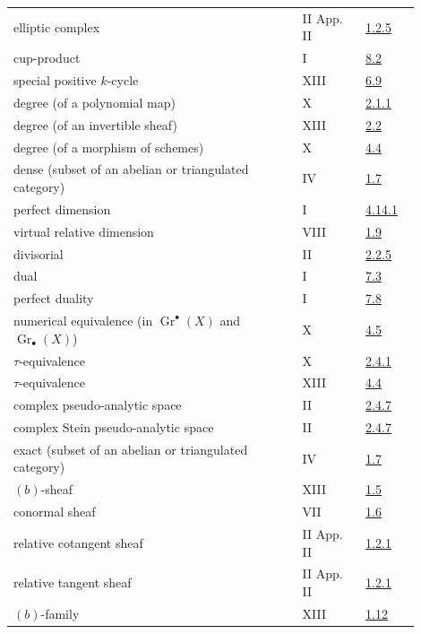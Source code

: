 \begin{longtable}{@{}>{\raggedright\arraybackslash}p{0.64\linewidth}>{\raggedright\arraybackslash}p{0.14\linewidth}>{\raggedright\arraybackslash}p{0.12\linewidth}@{}}
elliptic complex & II App. II & \hyperlink{sga6.e02.para.1-2-5}{1.2.5}\\
cup-product & I & \hyperlink{sga6.e01.para.8-2}{8.2}\\
special positive \(k\)-cycle & XIII & \hyperlink{sga6.e13.def.6-9}{6.9}\\
degree (of a polynomial map) & X & \hyperlink{sga6.e10.def.2-1-1}{2.1.1}\\
degree (of an invertible sheaf) & XIII & \hyperlink{sga6.e13.para.2-2}{2.2}\\
degree (of a morphism of schemes) & X & \hyperlink{sga6.e10.sec.4.4}{4.4}\\
dense (subset of an abelian or triangulated category) & IV & \hyperlink{sga6.e04.def.1-7}{1.7}\\
perfect dimension & I & \hyperlink{sga6.e01.def.4-14-1}{4.14.1}\\
virtual relative dimension & VIII & \hyperlink{sga6.e08.def.1-9}{1.9}\\
divisorial & II & \hyperlink{sga6.e02.def.2-2-5}{2.2.5}\\
dual & I & \hyperlink{sga6.e01.def.7-3}{7.3}\\
perfect duality & I & \hyperlink{sga6.e01.cor.7-8}{7.8}\\
numerical equivalence (in \(\operatorname{Gr}^\bullet(X)\) and \(\operatorname{Gr}_\bullet(X)\)) & X & \hyperlink{sga6.e10.sec.4.5}{4.5}\\
\(\tau\)-equivalence & X & \hyperlink{sga6.e10.def.2-4-1}{2.4.1}\\
\(\tau\)-equivalence & XIII & \hyperlink{sga6.e13.para.4-4}{4.4}\\
complex pseudo-analytic space & II & \hyperlink{sga6.e02.def.2-4-7}{2.4.7}\\
complex Stein pseudo-analytic space & II & \hyperlink{sga6.e02.def.2-4-7}{2.4.7}\\
exact (subset of an abelian or triangulated category) & IV & \hyperlink{sga6.e04.def.1-7}{1.7}\\
\((b)\)-sheaf & XIII & \hyperlink{sga6.e13.def.1-5}{1.5}\\
conormal sheaf & VII & \hyperlink{sga6.e07.def.1-6}{1.6}\\
relative cotangent sheaf & II App. II & \hyperlink{sga6.e02.para.1-2-1}{1.2.1}\\
relative tangent sheaf & II App. II & \hyperlink{sga6.e02.para.1-2-1}{1.2.1}\\
\((b)\)-family & XIII & \hyperlink{sga6.e13.para.1-12}{1.12}\\

\end{longtable}
